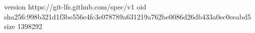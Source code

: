 version https://git-lfs.github.com/spec/v1
oid sha256:998b321d1f3be556e4fc3e078789a631219a762be0086d26db433a0ec0eeabd5
size 1398292
